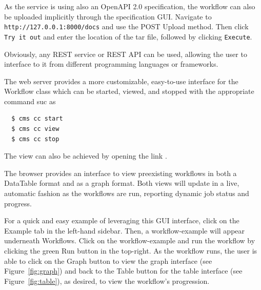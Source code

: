 \documentclass[sigplan,screen]{acmart}
\begin{document}
As the service is using also an OpenAPI 2.0 specification, the
workflow can also be uploaded implicitly through the specification
GUI. Navigate to {\scriptsize \texttt{http://127.0.0.1:8000/docs}} and
use the POST Upload method. Then click {\scriptsize \texttt{Try\ it\ out}}
and enter the location of the tar file, followed by clicking
{\scriptsize \texttt{Execute}}.

Obviously, any REST service or REST API can be used, allowing the user
to interface to it from different programming languages or frameworks.

The web server provides a more customizable, easy-to-use interface for
the Workflow class which can be started, viewed, and stopped with the
appropriate command suc as

{\scriptsize
\begin{verbatim}
  $ cms cc start
  $ cms cc view
  $ cms cc stop
\end{verbatim}}

The view can also be achieved by opening the 
link .

The browser provides an interface to view preexisting workflows in
both a DataTable format and as a graph format. Both views will update
in a live, automatic fashion as the workflows are run, reporting
dynamic job status and progress.

For a quick and easy example of leveraging this GUI interface, click
on the Example tab in the left-hand sidebar. Then, a workflow-example
will appear underneath Workflows. Click on the workflow-example and
run the workflow by clicking the green Run button in the top-right. As
the workflow runs, the user is able to click on the Graph button to
view the graph interface (see Figure~\ref{fig:graph}) and back to the
Table button for the table interface (see Figure~\ref{fig:table}), as
desired, to view the workflow's progression.
\end{document}
